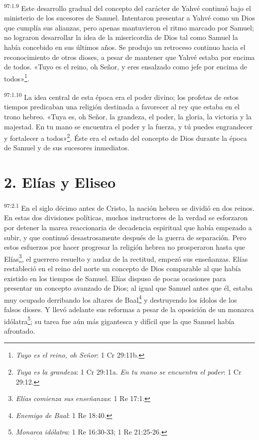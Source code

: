\par
\textsuperscript{97:1.9} Este desarrollo gradual del concepto del carácter de Yahvé continuó bajo el ministerio de los sucesores de Samuel. Intentaron presentar a Yahvé como un Dios que cumplía sus alianzas, pero apenas mantuvieron el ritmo marcado por Samuel; no lograron desarrollar la idea de la misericordia de Dios tal como Samuel la había concebido en sus últimos años. Se produjo un retroceso continuo hacia el reconocimiento de otros dioses, a pesar de mantener que Yahvé estaba por encima de todos. «Tuyo es el reino, oh Señor, y eres ensalzado como jefe por encima de todos»\footnote{\textit{Tuyo es el reino, oh Señor}: 1 Cr 29:11b.}.

\par
\textsuperscript{97:1.10} La idea central de esta época era el poder divino; los profetas de estos tiempos predicaban una religión destinada a favorecer al rey que estaba en el trono hebreo. «Tuya es, oh Señor, la grandeza, el poder, la gloria, la victoria y la majestad. En tu mano se encuentra el poder y la fuerza, y tú puedes engrandecer y fortalecer a todos»\footnote{\textit{Tuya es la grandeza}: 1 Cr 29:11a. \textit{En tu mano se encuentra el poder}: 1 Cr 29:12.}. Éste era el estado del concepto de Dios durante la época de Samuel y de sus sucesores inmediatos.

\section*{2. Elías y Eliseo}
\par
\textsuperscript{97:2.1} En el siglo décimo antes de Cristo, la nación hebrea se dividió en dos reinos. En estas dos divisiones políticas, muchos instructores de la verdad se esforzaron por detener la marea reaccionaria de decadencia espiritual que había empezado a subir, y que continuó desastrosamente después de la guerra de separación. Pero estos esfuerzos por hacer progresar la religión hebrea no prosperaron hasta que Elías\footnote{\textit{Elías comienza sus enseñanzas}: 1 Re 17:1.}, el guerrero resuelto y audaz de la rectitud, empezó sus enseñanzas. Elías restableció en el reino del norte un concepto de Dios comparable al que había existido en los tiempos de Samuel. Elías dispuso de pocas ocasiones para presentar un concepto avanzado de Dios; al igual que Samuel antes que él, estaba muy ocupado derribando los altares de Baal\footnote{\textit{Enemigo de Baal}: 1 Re 18:40.} y destruyendo los ídolos de los falsos dioses. Y llevó adelante sus reformas a pesar de la oposición de un monarca idólatra\footnote{\textit{Monarca idólatra}: 1 Re 16:30-33; 1 Re 21:25-26.}; su tarea fue aún más gigantesca y difícil que la que Samuel había afrontado.

